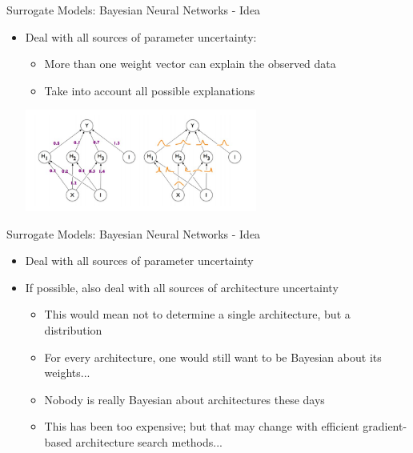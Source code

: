 \begin{frame}[c]{Surrogate Models: Bayesian Neural Networks - Idea}

\begin{itemize}
    \item Deal with all sources of parameter uncertainty: \pause
    \begin{itemize}
        \item More than one weight vector can explain the observed data 
        \item Take into account all possible explanations 
    \end{itemize}

\centering
\includegraphics[width=0.6\textwidth]{w06_hpo_bo/images/surrogate_models/bnn.jpg}

\end{itemize}


\end{frame}

\begin{frame}[c]{Surrogate Models: Bayesian Neural Networks - Idea}

\begin{itemize}
    \item Deal with all sources of parameter uncertainty
    \item If possible, also deal with all sources of architecture uncertainty \pause
     \begin{itemize}
        \item This would mean not to determine a single architecture, but a
distribution \pause
        \item For every architecture, one would still want to be Bayesian about its weights... \pause
        \item Nobody is really Bayesian about architectures these days \pause
        \item This has been too expensive; but that may change with efficient
gradient-based architecture search methods...
    \end{itemize}
\end{itemize}

\end{frame}


